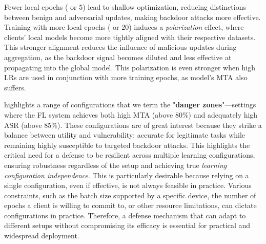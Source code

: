 Fewer local epochs ( or 5) lead to shallow optimization, reducing distinctions between benign and adversarial updates, making backdoor attacks more effective. Training with more local epochs ( or 20) induces a \textit{polarization} effect, where clients' local models become more tightly aligned with their respective datasets. This stronger alignment reduces the influence of malicious updates during aggregation, as the backdoor signal becomes diluted and less effective at propagating into the global model. This polarization is even stronger when high LRs are used in conjunction with more training epochs, as model's MTA also suffers.

 highlights a range of configurations that we term the "\textbf{danger zones}"—settings where the FL system achieves both high MTA (above 80\%) and adequately high ASR (above 85\%). These configurations are of great interest because they strike a balance between utility and vulnerability; accurate for legitimate tasks while remaining highly susceptible to targeted backdoor attacks. This highlights the critical need for a defense to be resilient across multiple learning configurations, ensuring robustness regardless of the setup and achieving true \textit{learning configuration independence}. This is particularly desirable because relying on a single configuration, even if effective, is not always feasible in practice. Various constraints, such as the batch size supported by a specific device, the number of epochs a client is willing to commit to, or other resource limitations, can dictate configurations in practice. Therefore, a defense mechanism that can adapt to different setups without compromising its efficacy is essential for practical and widespread deployment.


